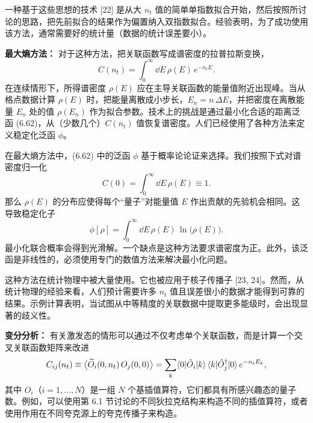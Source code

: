 一种基于这些思想的技术 [22] 是从大 $n_t$ 值的简单单指数拟合开始，然后按照所讨论的思路，把先前拟合的结果作为偏置纳入双指数拟合。经验表明，为了成功使用该方法，通常需要好的统计量（数据的统计误差要小）。

\textbf{最大熵方法：} 对于这种方法，把关联函数写成谱密度的拉普拉斯变换，
\begin{equation}
  C(n_t) = \int_0^\infty \dd E\, \rho(E)\, e^{-n_t E} .
\end{equation}
在连续情形下，所得谱密度 $\rho(E)$ 应在主导关联函数的能量值附近出现峰。当从格点数据计算 $\rho(E)$ 时，把能量离散成小步长，$E_n = n\,\Delta E$，并把密度在离散能量 $E_n$ 处的值 $\rho(E_n)$ 作为拟合参数。技术上的挑战是通过最小化合适的距离泛函 (6.62)，从（少数几个）$C(n_t)$ 值恢复谱密度。人们已经使用了各种方法来定义稳定化泛函 $\phi$。

在最大熵方法中，(6.62) 中的泛函 $\phi$ 基于概率论论证来选择。我们按照下式对谱密度归一化
\begin{equation}
  C(0) = \int_0^\infty \dd E\, \rho(E) \equiv 1 .
\end{equation}
那么 $\rho(E)$ 的分布应使得每个“量子”对能量值 $E$ 作出贡献的先验机会相同。这导致稳定化子
\begin{equation}
  \phi[\rho] = \int_0^\infty \dd E\, \rho(E)\, \ln\!\big( \rho(E) \big) .
\end{equation}
最小化联合概率会得到光滑解。一个缺点是这种方法要求谱密度为正。此外，该泛函是非线性的，必须使用专门的数值方法来解决最小化问题。

这种方法在统计物理中被大量使用。它也被应用于核子传播子 [23, 24]。然而，从统计物理的经验来看，人们预计需要许多 $n_t$ 值且误差很小的数据才能得到可靠的结果。示例计算表明，当试图从中等精度的关联数据中提取更多能级时，会出现显著的歧义性。

\textbf{变分分析：} 有关激发态的情形可以通过不仅考虑单个关联函数，而是计算一个交叉关联函数矩阵来改进
\begin{equation}
  C_{ij}(n_t) \equiv \big\langle \widetilde{O}_i(0, n_t)\, O_j(0, 0) \big\rangle
  = \sum_k \langle0|\hat{O}_i|k\rangle\,\langle k|\hat{O}_j^\dagger|0\rangle\,
    e^{-n_t E_k} ,
\end{equation}
其中 $O_i$（$i = 1, \ldots, N$）是一组 $N$ 个基插值算符，它们都具有所感兴趣态的量子数。例如，可以使用第 6.1 节讨论的不同狄拉克结构来构造不同的插值算符，或者使用作用在不同夸克源上的夸克传播子来构造。

